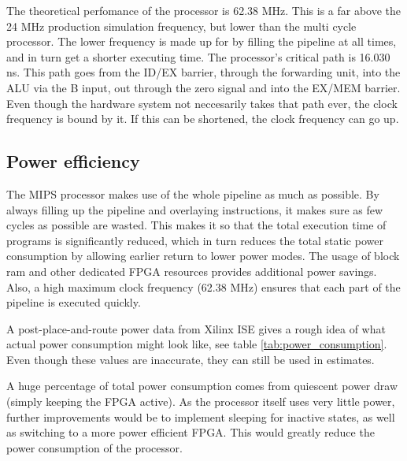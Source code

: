 The theoretical perfomance of the processor is 62.38 MHz.
This is a far above the 24 MHz production simulation frequency, but lower than the multi cycle processor.
The lower frequency is made up for by filling the pipeline at all times, and in turn get a shorter executing time.
The processor's critical path is 16.030 ns.
This path goes from the ID/EX barrier, through the forwarding unit, into the ALU via the B input, out through the zero signal and into the EX/MEM barrier.
Even though the hardware system not neccesarily takes that path ever, the clock frequency is bound by it.
If this can be shortened, the clock frequency can go up.


\subsection{Power efficiency}

The MIPS processor makes use of the whole pipeline as much as possible.
By always filling up the pipeline and overlaying instructions, it makes sure as few cycles as possible are wasted.
This makes it so that the total execution time of programs is significantly reduced, which in turn reduces the total static power consumption by allowing earlier return to lower power modes.
The usage of block ram and other dedicated FPGA resources provides additional power savings.
Also, a high maximum clock frequency (62.38 MHz) ensures that each part of the pipeline is executed quickly.

A post-place-and-route power data from Xilinx ISE gives a rough idea of what actual power consumption might look like, see table \ref{tab:power_consumption}.
Even though these values are inaccurate, they can still be used in estimates.

A huge percentage of total power consumption comes from quiescent power draw (simply keeping the FPGA active).
As the processor itself uses very little power, further improvements would be to implement sleeping for inactive states, as well as switching to a more power efficient FPGA.
This would greatly reduce the power consumption of the processor.


